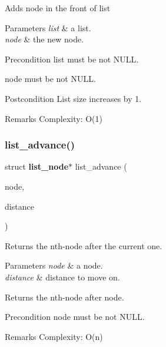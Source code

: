 Adds {\ttfamily node} in the front of {\ttfamily list}


\begin{DoxyParams}{Parameters}
{\em list} & a list. \\
\hline
{\em node} & the new node.\\
\hline
\end{DoxyParams}
\begin{DoxyPrecond}{Precondition}
{\ttfamily list} must be not N\+U\+LL. 

{\ttfamily node} must be not N\+U\+LL.
\end{DoxyPrecond}
\begin{DoxyPostcond}{Postcondition}
List size increases by 1.
\end{DoxyPostcond}
\begin{DoxyRemark}{Remarks}
Complexity\+: O(1) 
\end{DoxyRemark}
\mbox{\label{list_8c_a3e71507d9a07668a357907d4515336de}} 
\subsubsection{list\+\_\+advance()}
{\footnotesize\ttfamily struct \textbf{ list\+\_\+node}$\ast$ list\+\_\+advance (\begin{DoxyParamCaption}\item[{struct \textbf{ list\+\_\+node} $\ast$}]{node,  }\item[{size\+\_\+t}]{distance }\end{DoxyParamCaption})}

Returns the nth-\/node after the current one.


\begin{DoxyParams}{Parameters}
{\em node} & a node. \\
\hline
{\em distance} & distance to move on. \\
\hline
\end{DoxyParams}
\begin{DoxyReturn}{Returns}
the nth-\/node after {\ttfamily node}.
\end{DoxyReturn}
\begin{DoxyPrecond}{Precondition}
{\ttfamily node} must be not N\+U\+LL.
\end{DoxyPrecond}
\begin{DoxyRemark}{Remarks}
Complexity\+: O(n) 
\end{DoxyRemark}
\mbox{\label{list_8c_a40638777b5f341c88e8b09acf75fb8c9}} 
